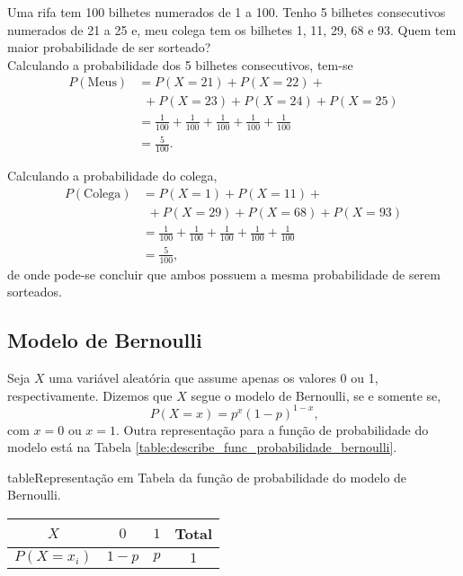 \begin{example}
	Uma rifa tem 100 bilhetes numerados de 1 a 100. Tenho 5 bilhetes consecutivos numerados de 21 a 25 e, meu colega tem os bilhetes 1, 11, 29, 68 e 93. Quem tem maior probabilidade de ser sorteado?\\
	
	Calculando a probabilidade dos 5 bilhetes consecutivos, tem-se
	\begin{align*}
		P(\text{Meus})&=P(X=21)+P(X=22)+\\
					  &\hspace{5pt}+P(X=23)+P(X=24)+P(X=25)\\
					  &=\frac{1}{100}+\frac{1}{100}+\frac{1}{100}+\frac{1}{100}+\frac{1}{100}\\
					  &=\frac{5}{100}\text{.}
	\end{align*}
	
	Calculando a probabilidade do colega,
	\begin{align*}
		P(\text{Colega})&=P(X=1)+P(X=11)+\\
						&\hspace{5pt}+P(X=29)+P(X=68)+P(X=93)\\
						&=\frac{1}{100}+\frac{1}{100}+\frac{1}{100}+\frac{1}{100}+\frac{1}{100}\\
					  &=\frac{5}{100}\text{,}
	\end{align*}
	de onde pode-se concluir que ambos possuem a mesma probabilidade de serem sorteados.
\end{example}

\subsection{Modelo de Bernoulli}

Seja $X$ uma variável aleatória que assume apenas os valores 0 ou 1, respectivamente. Dizemos que $X$ segue o modelo de Bernoulli, se e somente se,
\begin{equation}
	P(X=x)=p^x(1-p)^{1-x}\text{,}
\end{equation}
com $x=0$ ou $x=1$. Outra representação para a função de probabilidade do modelo está na Tabela \ref{table:describe_func_probabilidade_bernoulli}.

\begin{sidepicture}{5cm}{table}{Representação em Tabela da função de probabilidade do modelo de Bernoulli.}
	\label{table:describe_func_probabilidade_bernoulli}
	\begin{tabular}{c|cc|c}\toprule
		$X$ & $0$ & $1$ & Total \\ \midrule
		$P(X=x_i)$ & $1-p$ & $p$ & $1$\\\bottomrule
	\end{tabular}
\end{sidepicture}

